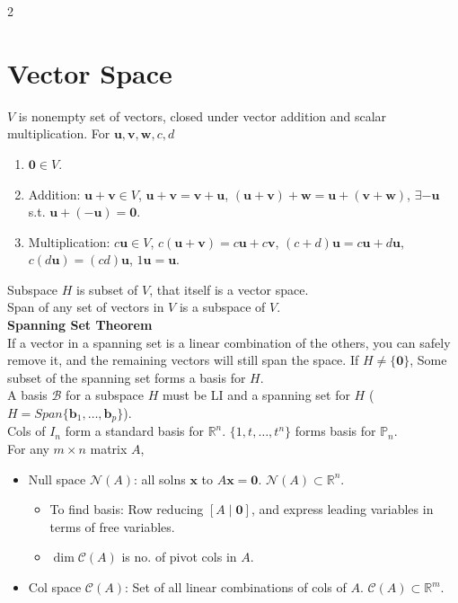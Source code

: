 \documentclass[10pt]{article}
\begin{document}
\begin{multicols*}{2}
\section*{Vector Space}
$V$ is nonempty set of vectors, closed under vector addition and scalar multiplication.
For $\mathbf{u},\mathbf{v},\mathbf{w},c,d$
\begin{enumerate}
    \item $\mathbf{0} \in V$.
    \item Addition: $\mathbf{u}+\mathbf{v} \in V$, $\mathbf{u}+\mathbf{v}=\mathbf{v}+\mathbf{u}$, $(\mathbf{u}+\mathbf{v})+\mathbf{w} = \mathbf{u}+(\mathbf{v}+\mathbf{w})$, $\exists -\mathbf{u}$ s.t. $\mathbf{u} + (-\mathbf{u}) = \mathbf{0}$.
    \item Multiplication: $c\mathbf{u}\in V$, $c(\mathbf{u} + \mathbf{v}) = c\mathbf{u} + c\mathbf{v}$, $(c + d)\mathbf{u} = c\mathbf{u} + d\mathbf{u}$, $c(d\mathbf{u}) = (cd)\mathbf{u}$, $1\mathbf{u} = \mathbf{u}$.
\end{enumerate}
Subspace $H$ is subset of $V$, that itself is a vector space.\\
Span of any set of vectors in $V$ is a subspace of $V$.\\
\textbf{Spanning Set Theorem}\\
If a vector in a spanning set is a linear combination of the others, you can safely remove it, and the remaining vectors will still span the space.
If $H \neq \{\mathbf{0}\}$, Some subset of the spanning set forms a basis for $H$.\\
A basis $\mathcal{B}$ for a subspace $H$ must be LI and a spanning set for $H$ ($H = Span\{\mathbf{b}_1,\ldots,\mathbf{b}_p\}$).\\
Cols of $I_n$ form a standard basis for $\mathbb{R}^n$. $\{1,t,\ldots,t^n\}$ forms basis for $\mathbb{P}_n$.\\
For any $m \times n$ matrix $A$,
\begin{itemize}
    \item Null space $\mathcal{N}(A)$: all solns $\mathbf{x}$ to $A\mathbf{x}=\mathbf{0}$. $\mathcal{N}(A)\subset\mathbb{R}^n$.
    \begin{itemize}
        \item To find basis: Row reducing $[A \mid \mathbf{0}]$, and express leading variables in terms of free variables.
        \item $\dim \mathcal{C}(A)$ is no. of pivot cols in $A$.
    \end{itemize}
    \item Col space $\mathcal{C}(A)$: Set of all linear combinations of cols of $A$. $\mathcal{C}(A)\subset\mathbb{R}^m$.

\end{itemize}
\end{multicols*}
\end{document}
